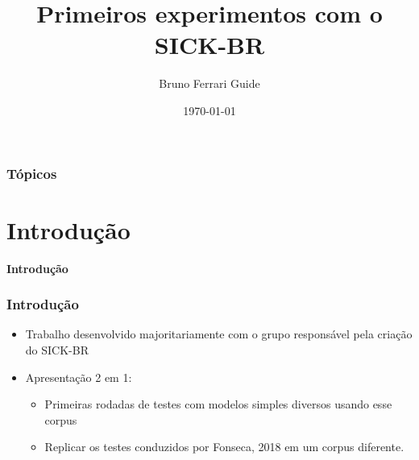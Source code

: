 \documentclass{beamer}
\title[V Workshop de Lx. Comp.]{Primeiros experimentos com o SICK-BR} %
\author{Bruno Ferrari Guide} %
\institute[USP/ Verbio] %
{Orientador: Marcos Lopes\\
Universidade de São Paulo \\ %
\medskip
\textit{bruno.guide@usp.br} %
}
\date{\today} %
\begin{document}
\begin{frame}
\titlepage %
\end{frame}

\begin{frame}
\frametitle{Tópicos} %
\tableofcontents %
\end{frame}


\section{Introdução}
	\begin{frame}
\centering \textbf{Introdução\\}
\end{frame}
\begin{frame}
\frametitle{Introdução}
\begin{itemize}
	\item Trabalho desenvolvido majoritariamente com o grupo responsável pela criação do SICK-BR\\
	\item Apresentação 2 em 1:
	\begin{itemize}
		\item Primeiras rodadas de testes com modelos simples diversos usando esse corpus\\
		\item Replicar os testes conduzidos por Fonseca, 2018 em um corpus diferente.\\
	\end{itemize}
	
\end{itemize}
\end{frame}
\end{document}
